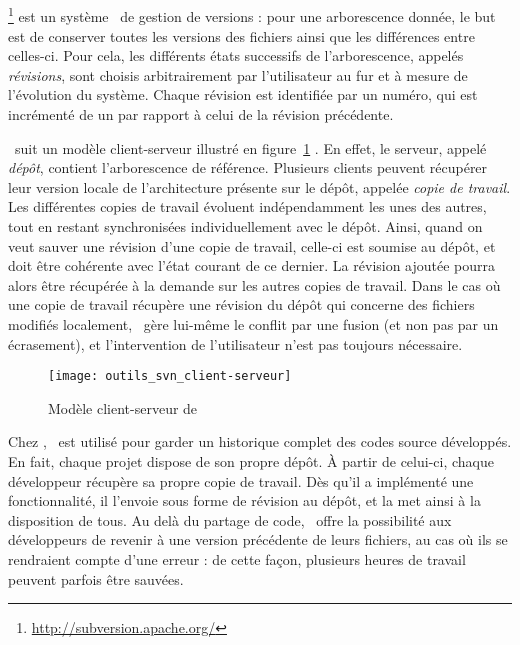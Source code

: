 \subsection{\asvn}
\label{section:outils_svn}

\asvn\footnote{\url{http://subversion.apache.org/}} est un système \aos\ de gestion de versions : pour une arborescence donnée, le but est de conserver toutes les versions des fichiers ainsi que les différences entre celles-ci. Pour cela, les différents états successifs de l'arborescence, appelés \emph{révisions}, sont choisis arbitrairement par l'utilisateur au fur et à mesure de l'évolution du système. Chaque révision est identifiée par un numéro, qui est incrémenté de un par rapport à celui de la révision précédente.

\asvn\ suit un modèle client-serveur illustré en figure~\ref{figure:outils_svn_client-serveur} . En effet, le serveur, appelé \emph{dépôt}, contient l'arborescence de référence. Plusieurs clients peuvent récupérer leur version locale de l'architecture présente sur le dépôt, appelée \emph{copie de travail}. Les différentes copies de travail évoluent indépendamment les unes des autres, tout en restant synchronisées individuellement avec le dépôt. Ainsi, quand on veut sauver une révision d'une copie de travail, celle-ci est soumise au dépôt, et doit être cohérente avec l'état courant de ce dernier. La révision ajoutée pourra alors être récupérée à la demande sur les autres copies de travail. Dans le cas où une copie de travail récupère une révision du dépôt qui concerne des fichiers modifiés localement, \asvn\ gère lui-même le conflit par une fusion (et non pas par un écrasement), et l'intervention de l'utilisateur n'est pas toujours nécessaire.

\begin{figure}
	\centering
	\texttt{[image: outils\_svn\_client-serveur]}
	\caption{Modèle client-serveur de \asvn}
	\label{figure:outils_svn_client-serveur}
\end{figure}

Chez \asl, \asvn\ est utilisé pour garder un historique complet des codes source développés. En fait, chaque projet dispose de son propre dépôt. À partir de celui-ci, chaque développeur récupère sa propre copie de travail. Dès qu'il a implémenté une fonctionnalité, il l'envoie sous forme de révision au dépôt, et la met ainsi à la disposition de tous. Au delà du partage de code, \asvn\ offre la possibilité aux développeurs de revenir à une version précédente de leurs fichiers, au cas où ils se rendraient compte d'une erreur : de cette façon, plusieurs heures de travail peuvent parfois être sauvées.
